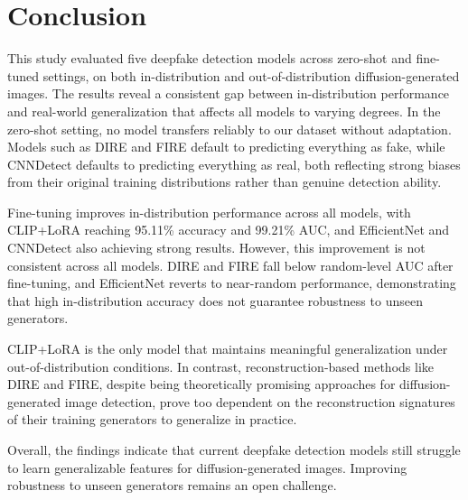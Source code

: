 \section{Conclusion}
\label{sec:conclusion}
This study evaluated five deepfake detection models across zero-shot and fine-tuned settings, on both in-distribution and out-of-distribution diffusion-generated images. The results reveal a consistent gap between in-distribution performance and real-world generalization that affects all models to varying degrees.
In the zero-shot setting, no model transfers reliably to our dataset without adaptation. Models such as DIRE and FIRE default to predicting everything as fake, while CNNDetect defaults to predicting everything as real, both reflecting strong biases from their original training distributions rather than genuine detection ability. 

Fine-tuning improves in-distribution performance across all models, with CLIP+LoRA reaching 95.11\% accuracy and 99.21\% AUC, and EfficientNet and CNNDetect also achieving strong results. However, this improvement is not consistent across all models. DIRE and FIRE fall below random-level AUC after fine-tuning, and EfficientNet reverts to near-random performance, demonstrating that high in-distribution accuracy does not guarantee robustness to unseen generators.

CLIP+LoRA is the only model that maintains meaningful generalization under out-of-distribution conditions. In contrast, reconstruction-based methods like DIRE and FIRE, despite being theoretically promising approaches for diffusion-generated image detection, prove too dependent on the reconstruction signatures of their training generators to generalize in practice.


Overall, the findings indicate that current deepfake detection models still struggle to learn generalizable features for diffusion-generated images. Improving robustness to unseen generators remains an open challenge.